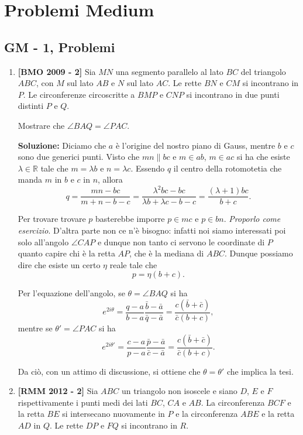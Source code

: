 \clearpage

\section{Problemi Medium}
\subsection{GM - 1, Problemi}
\begin{enumerate}
	\item \textbf{[BMO 2009 - 2]} Sia $MN$ una segmento parallelo al lato $BC$ del triangolo $ABC$, con $M$ sul lato $AB$ e $N$ sul lato $AC$. Le rette $BN$ e $CM$ si incontrano in $P$. Le circonferenze circoscritte a $BMP$ e $CNP$ si incontrano in due punti distinti $P$ e $Q$. 
	
	Mostrare che $\angle BAQ = \angle PAC$.
	
	\textbf{Soluzione:} Diciamo che $a$ è l'origine del nostro piano di Gauss, mentre $b$ e $c$ sono due generici punti. Visto che $mn\parallel bc$ e $m\in ab$, $m\in ac$ si ha che esiste $\lambda \in \mathbb R$ tale che $m=\lambda b$ e $n=\lambda c$. Essendo $q$ il centro della rotomotetia che manda $m$ in $b$ e $c$ in $n$, allora 
	$$
	q=\frac{mn-bc}{m+n-b-c}=\frac{\lambda^2bc-bc}{\lambda b+\lambda c-b-c}=\frac{(\lambda+1)bc}{b+c}.
	$$
	
	Per trovare trovare $p$ basterebbe imporre $p\in mc$ e $p\in bn$. \emph{Proporlo come esercizio}. D'altra parte non ce n'è bisogno: infatti noi siamo interessati poi solo all'angolo $\angle CAP$ e dunque non tanto ci servono le coordinate di $P$ quanto capire chi è la retta $AP$, che è la mediana di $ABC$. Dunque possiamo dire che esiste un certo $\eta$ reale tale che 
	$$
	p=\eta(b+c).
	$$ 
	
	Per l'equazione dell'angolo, se $\theta=\angle BAQ$ si ha 
	$$
	e^{2i\theta}=\frac{q-a}{b-a}\frac{\bar b-\bar a}{\bar q-\bar a}=\frac{c(\bar b+\bar c)}{\bar c(b+c)},
	$$
	mentre se $\theta'=\angle PAC$ si ha 
	$$
	e^{2i\theta'}=\frac{c-a}{p-a}\frac{\bar p-\bar a}{\bar c-\bar a}=\frac{c(\bar b+\bar c)}{\bar c(b+c)}.
	$$
	
	Da ciò, con un attimo di discussione, si ottiene che $\theta=\theta'$ che implica la tesi. 
	
	\item \textbf{[RMM 2012 - 2]} Sia $ABC$ un triangolo non isoscele e siano $D$, $E$ e $F$ rispettivamente i punti medi dei lati $BC$, $CA$ e $AB$. La circonferenza $BCF$ e la retta $BE$ si intersecano nuovamente in $P$ e la circonferenza $ABE$ e la retta $AD$ in $Q$. Le rette $DP$ e $FQ$ si incontrano in $R$. 
	

\end{enumerate}
